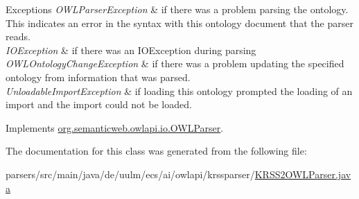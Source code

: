 \begin{DoxyExceptions}{Exceptions}
{\em O\-W\-L\-Parser\-Exception} & if there was a problem parsing the ontology. This indicates an error in the syntax with this ontology document that the parser reads. \\
\hline
{\em I\-O\-Exception} & if there was an I\-O\-Exception during parsing \\
\hline
{\em O\-W\-L\-Ontology\-Change\-Exception} & if there was a problem updating the specified ontology from information that was parsed. \\
\hline
{\em Unloadable\-Import\-Exception} & if loading this ontology prompted the loading of an import and the import could not be loaded. \\
\hline
\end{DoxyExceptions}


Implements \hyperlink{interfaceorg_1_1semanticweb_1_1owlapi_1_1io_1_1_o_w_l_parser_a259739c6baf94f4e5a2dad5d0400f07a}{org.\-semanticweb.\-owlapi.\-io.\-O\-W\-L\-Parser}.



The documentation for this class was generated from the following file\-:\begin{DoxyCompactItemize}
\item 
parsers/src/main/java/de/uulm/ecs/ai/owlapi/krssparser/\hyperlink{_k_r_s_s2_o_w_l_parser_8java}{K\-R\-S\-S2\-O\-W\-L\-Parser.\-java}\end{DoxyCompactItemize}

